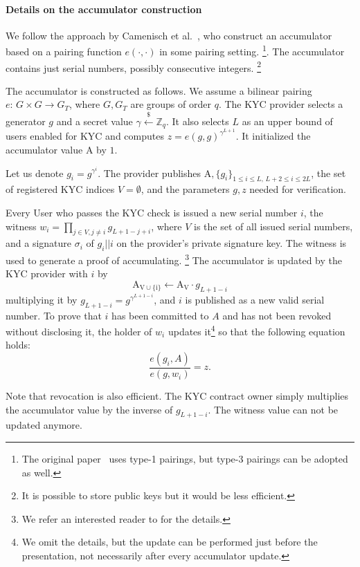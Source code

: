 \paragraph{Details on the accumulator construction}
We follow the approach by Camenisch et al.~\cite{Camenisch2009}, who construct an accumulator based on a pairing function $e(\cdot,\cdot)$ in some pairing setting.
\footnote{The original paper~\cite{Camenisch2009} uses type-1 pairings, but type-3 pairings can be adopted as well.}.
The accumulator contains just serial numbers, possibly consecutive integers.
\footnote{It is possible to store public keys but it would be less efficient.}

The accumulator is constructed as follows.
We assume a bilinear pairing $e:\,G\times G\rightarrow G_T$, where $G,G_T$ are groups of order $q$.
The KYC provider selects a generator $g$ and a secret value $\gamma\overset{\$}{\leftarrow} \mathbb{Z}_q$.
It also selects $L$ as an upper bound of users enabled for KYC and computes $z = e(g,g)^{\gamma^{L+1}}$.
It initialized the accumulator value $\mathrm{A}$ by $1$. 

Let us denote $g_i = g^{\gamma^i}$.
The provider publishes $\mathrm{A},\{g_i\}_{1\leq i\leq L, \,L+2\leq i \leq 2L}$, the set of registered KYC indices $V=\emptyset$, and the parameters $g,z$ needed for verification.

Every User who passes the KYC check is issued a new serial number $i$, the witness $w_i = \prod_{j\in V,j\neq i} g_{L+1-j+i}$, where $V$ is the set of all issued serial numbers, and a signature $\sigma_i$ of $g_i||i$ on the provider's private signature key.
The witness is used to generate a proof of accumulating.
\footnote{We refer an interested reader to \cite{Camenisch2009} for the details.}
The accumulator is updated by the KYC provider with $i$ by
$$
\mathrm{A_{V\cup\{i\}}} \leftarrow \mathrm{A_V} \cdot g_{L+1-i}
$$
multiplying it by $g_{L+1-i} = g^{\gamma^{L+1-i}}$, and $i$ is published as a new valid serial number.
To prove that $i$ has been committed to $A$ and has not been revoked without disclosing it, the holder of $w_i$ updates it\footnote{We omit the details, but the update can be performed just before the presentation, not necessarily after every accumulator update.} so that the following equation holds:
$$
\frac{e(g_i, A)}{e(g,w_i)} = z.
$$

Note that revocation is also efficient.
The KYC contract owner simply multiplies the accumulator value by the inverse of $g_{L+1-i}$.
The witness value can not be updated anymore.

